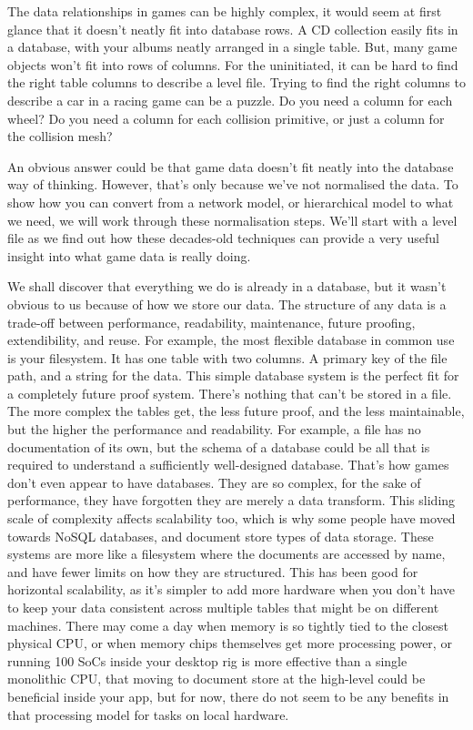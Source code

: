 \documentclass[a4paper,12pt]{article}
\begin{document}
The data relationships in games can be highly complex, it would seem at first glance that it doesn't neatly fit into database rows.
A CD collection easily fits in a database, with your albums neatly arranged in a single table.
But, many game objects won't fit into rows of columns.
For the uninitiated, it can be hard to find the right table columns to describe a level file.
Trying to find the right columns to describe a car in a racing game can be a puzzle.
Do you need a column for each wheel? Do you need a column for each collision primitive, or just a column for the collision mesh?

An obvious answer could be that game data doesn't fit neatly into the database way of thinking.
However, that's only because we've not normalised the data.
To show how you can convert from a network model, or hierarchical model to what we need, we will work through these normalisation steps.
We'll start with a level file as we find out how these decades-old techniques can provide a very useful insight into what game data is really doing.

We shall discover that everything we do is already in a database, but it wasn't obvious to us because of how we store our data.
The structure of any data is a trade-off between performance, readability, maintenance, future proofing, extendibility, and reuse.
For example, the most flexible database in common use is your filesystem.
It has one table with two columns. A primary key of the file path, and a string for the data.
This simple database system is the perfect fit for a completely future proof system.
There's nothing that can't be stored in a file.
The more complex the tables get, the less future proof, and the less maintainable, but the higher the performance and readability.
For example, a file has no documentation of its own, but the schema of a database could be all that is required to understand a sufficiently well-designed database.
That's how games don't even appear to have databases.
They are so complex, for the sake of performance, they have forgotten they are merely a data transform.
This sliding scale of complexity affects scalability too, which is why some people have moved towards NoSQL databases, and document store types of data storage.
These systems are more like a filesystem where the documents are accessed by name, and have fewer limits on how they are structured.
This has been good for horizontal scalability, as it's simpler to add more hardware when you don't have to keep your data consistent across multiple tables that might be on different machines.
There may come a day when memory is so tightly tied to the closest physical CPU, or when memory chips themselves get more processing power, or running 100 SoCs inside your desktop rig is more effective than a single monolithic CPU, that moving to document store at the high-level could be beneficial inside your app, but for now, there do not seem to be any benefits in that processing model for tasks on local hardware.
\end{document}
